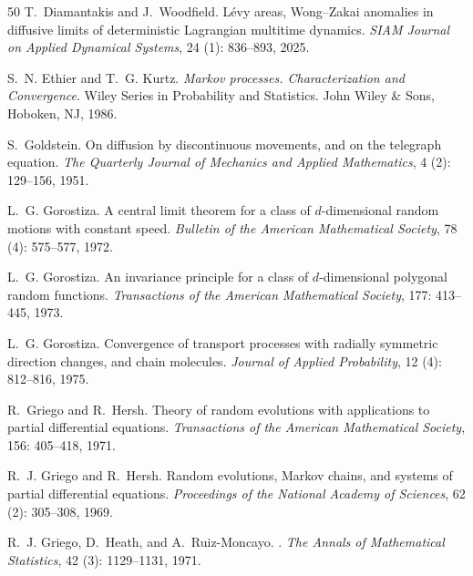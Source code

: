 \documentclass[10pt]{article}
\newcommand{\1}{1\!\!\!\;{\rm I}}
\theoremstyle{plain}
\theoremstyle{definition}
\numberwithin{equation}{section}
\begin{document}
\begin{thebibliography}{50}
T.~Diamantakis and J.~Woodfield.
\newblock L{\'e}vy areas, {W}ong--{Z}akai anomalies in diffusive limits of
  deterministic {L}agrangian multitime dynamics.
\newblock \emph{SIAM Journal on Applied Dynamical Systems}, 24
  (1): 836--893, 2025.

S.~N. Ethier and T.~G. Kurtz.
\newblock \emph{Markov processes. Characterization and Convergence}.
\newblock Wiley Series in Probability and Statistics. John Wiley \& Sons,
  Hoboken, NJ, 1986.

S.~Goldstein.
\newblock On diffusion by discontinuous movements, and on the telegraph
  equation.
\newblock \emph{The Quarterly Journal of Mechanics and Applied Mathematics},
  4 (2): 129--156, 1951.

L.~G. Gorostiza.
\newblock A central limit theorem for a class of $d$-dimensional random motions
  with constant speed.
\newblock \emph{Bulletin of the American Mathematical Society}, 78
  (4): 575--577, 1972.

L.~G. Gorostiza.
\newblock An invariance principle for a class of $d$-dimensional polygonal
  random functions.
\newblock \emph{Transactions of the American Mathematical Society},
  177: 413--445, 1973.

L.~G. Gorostiza.
\newblock Convergence of transport processes with radially symmetric direction
  changes, and chain molecules.
\newblock \emph{Journal of Applied Probability}, 12 (4):
  812--816, 1975.

R.~Griego and R.~Hersh.
\newblock Theory of random evolutions with applications to partial differential
  equations.
\newblock \emph{Transactions of the American Mathematical Society},
  156: 405--418, 1971.

R.~J. Griego and R.~Hersh.
\newblock Random evolutions, {M}arkov chains, and systems of partial
  differential equations.
\newblock \emph{Proceedings of the National Academy of Sciences}, 62
  (2): 305--308, 1969.

R.~J. Griego, D.~Heath, and A.~Ruiz-Moncayo.
.
\newblock \emph{The Annals of Mathematical Statistics}, 42
  (3): 1129--1131, 1971.


\end{thebibliography}
\end{document}
